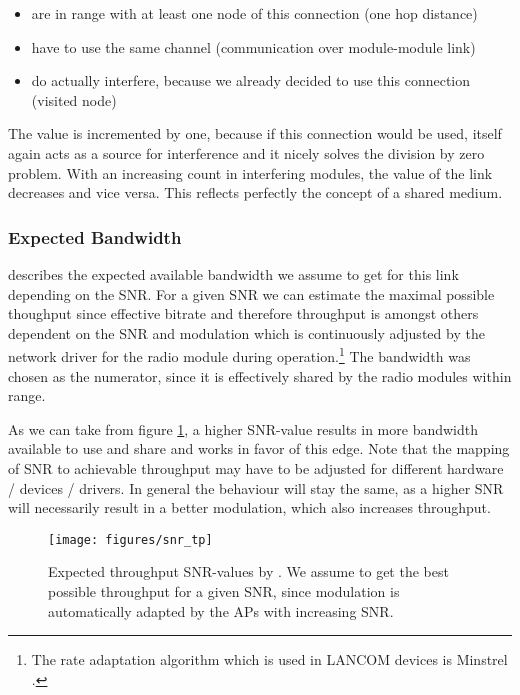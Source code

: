 	\begin{itemize}
	\item are in range with at least one node of this connection (one hop distance)
	
	\item have to use the same channel (communication over module-module link)
	
	\item do actually interfere, because we already decided to use this connection (visited node)
	\end{itemize}

	The value is incremented by one, because if this connection would be used, itself again acts as a source for interference and it nicely solves the division by zero
	problem. With an increasing count in interfering modules, the value of the link decreases and vice versa. This reflects perfectly the concept of a shared medium.

      \subsubsection{Expected Bandwidth}
	describes the expected available bandwidth we assume to get for this link depending on the \ac{SNR}.
	For a given \ac{SNR} we can estimate the maximal possible thoughput since effective bitrate and therefore throughput is amongst others dependent on the \ac{SNR}
	and modulation which is continuously adjusted by the network driver for the radio module during operation.\footnote{The rate adaptation algorithm 
	which is used in LANCOM devices is Minstrel \cite{minstrel}.} 
	The bandwidth was chosen as the numerator, since it is effectively shared by the radio modules within range.
	
	As we can take from figure \ref{fig:snr_tp}, a higher \ac{SNR}-value results in more bandwidth available to use and share and works in favor of this edge.
	Note that the mapping of \ac{SNR} to achievable throughput may have to be adjusted for different hardware / devices / drivers. 
	In general the behaviour will stay the same, as a higher \ac{SNR} will necessarily result in a better modulation, which also increases throughput.
	
	\begin{figure}[h!]
	  \centering
	  \texttt{[image: figures/snr\_tp]}
	  \caption{Expected throughput \ac{SNR}-values by \cite{expected_snr}. We assume to get the best possible throughput for a given \ac{SNR}, since 
	    modulation is automatically adapted by the APs with increasing \ac{SNR}.}
	  \label{fig:snr_tp}
	\end{figure}
	

